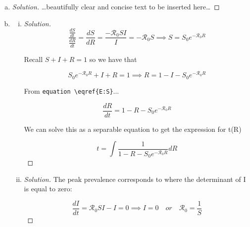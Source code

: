 \documentclass[12pt]{article}
\begin{document}
\basicSIRanalIntro
\begin{enumerate}[(a)]
\item \basicSIRanalQa

{\color{blue}
\begin{proof}[Solution]
{\color{magenta}\dots beautifully clear and concise text to be inserted here\dots}
\end{proof}
}

\item \basicSIRanalQb
  \begin{enumerate}[(i)]
  \item \basicSIRanalQbi

{\color{blue}
\begin{proof}[Solution]

	\begin{equation}
	\frac{\frac{dS}{dt}}{\frac{dR}{dt}} = \frac{dS}{dR} = \frac{-\mathcal{R}_0SI}{I} = -\mathcal{R}_0S \implies S=S_0e^{-\mathcal{R}_0R}
	\end{equation}
	
	Recall $S+I+R=1$ so we have that
	
	\begin{equation}
	S_0e^{-\mathcal{R}_0R}+I+R = 1 \implies R=1-I-S_0e^{-\mathcal{R}_0R}
	\end{equation}
	
	From \verb|equation \eqref{E:S}|...
	
	\begin{equation}
	\frac{dR}{dt}=1-R-S_0e^{-\mathcal{R}_0R}
	\end{equation}
	
	We can solve this as a separable equation to  get the expression for t(R)
	
	\begin{equation}
	t=\int \frac{1}{1-R-S_0e^{-\mathcal{R}_0R}}dR
	\end{equation}
	
\end{proof}
}

 \item \basicSIRanalQbii

{\color{blue}
\begin{proof}[Solution]
	The peak prevalence corresponds to where the determinant of I is equal to zero:
	
	\begin{equation}
	\frac{dI}{dt}=\mathcal{R}_0 SI-I=0 \implies I=0 \quad or \quad  \mathcal{R}_0=\frac{1}{S}
	\end{equation}
	

\end{proof}}
\end{enumerate}
\end{enumerate}
\end{document}
